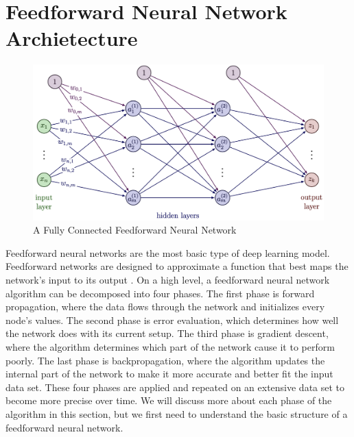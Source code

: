 \section{Feedforward Neural Network Archietecture} \label{sec:feedforward_nn}

\begin{figure}[!ht]
    \centering
    \includegraphics[width=5in]{figures/ffn_diagram.png}
    \caption{A Fully Connected Feedforward Neural Network} \label{fig:fc_ffn}
\end{figure}

Feedforward neural networks are the most basic type of deep learning model. Feedforward networks are designed to approximate a function that best maps the network's input to its output \cite{lecun2015deep}. On a high level, a feedforward neural network algorithm can be decomposed into four phases. The first phase is forward propagation, where the data flows through the network and initializes every node's values. The second phase is error evaluation, which determines how well the network does with its current setup. The third phase is gradient descent, where the algorithm determines which part of the network cause it to perform poorly. The last phase is backpropagation, where the algorithm updates the internal part of the network to make it more accurate and better fit the input data set. These four phases are applied and repeated on an extensive data set to become more precise over time. We will discuss more about each phase of the algorithm in this section, but we first need to understand the basic structure of a feedforward neural network.

